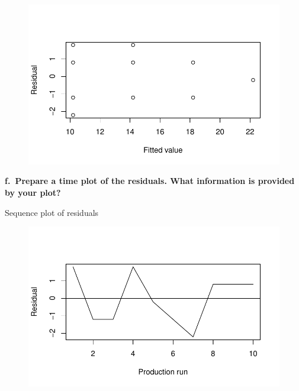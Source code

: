 \documentclass[
  letterpaper,
  DIV=11,
  numbers=noendperiod]{scrartcl}
\newenvironment{Shaded}{\begin{snugshade}}{\end{snugshade}}
\newcommand{\AttributeTok}[1]{\textcolor[rgb]{0.40,0.45,0.13}{#1}}
\newcommand{\DecValTok}[1]{\textcolor[rgb]{0.68,0.00,0.00}{#1}}
\newcommand{\FunctionTok}[1]{\textcolor[rgb]{0.28,0.35,0.67}{#1}}
\newcommand{\NormalTok}[1]{\textcolor[rgb]{0.00,0.23,0.31}{#1}}
\newcommand{\SpecialCharTok}[1]{\textcolor[rgb]{0.37,0.37,0.37}{#1}}
\newcommand{\StringTok}[1]{\textcolor[rgb]{0.13,0.47,0.30}{#1}}
\begin{document}
\begin{figure}[H]

{\centering \includegraphics{sta9700_ch3_hw_files/figure-pdf/unnamed-chunk-8-1.pdf}

}

\end{figure}

\textbf{f.~Prepare a time plot of the residuals. What information is
provided by your plot?}

Sequence plot of residuals

\begin{Shaded}
\end{Shaded}

\begin{figure}[H]

{\centering \includegraphics{sta9700_ch3_hw_files/figure-pdf/unnamed-chunk-9-1.pdf}

}

\end{figure}
\end{document}
